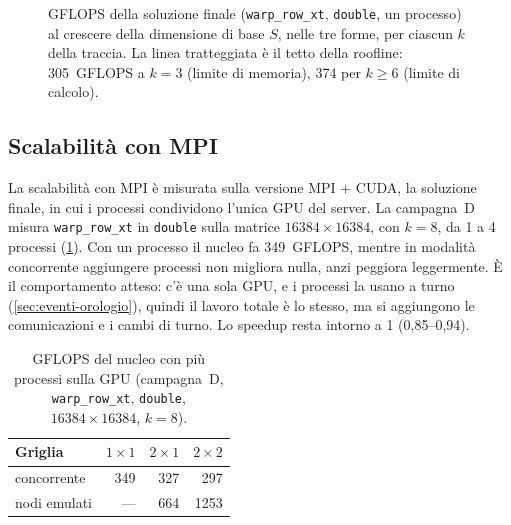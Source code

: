\documentclass[11pt,a4paper]{article}
\begin{document}
\begin{figure}[H]
  \caption{GFLOPS della soluzione finale (\texttt{warp\_row\_xt},
    \texttt{double}, un processo) al crescere della dimensione di base $S$,
    nelle tre forme, per ciascun $k$ della traccia. La linea tratteggiata è il
    tetto della roofline: 305~GFLOPS a $k = 3$ (limite di memoria), 374 per
    $k \ge 6$ (limite di calcolo).}\label{fig:ris-finale}
\end{figure}

\subsection{Scalabilità con MPI}\label{sec:ris-mpi}

La scalabilità con MPI è misurata sulla versione MPI + CUDA, la soluzione
finale, in cui i processi condividono l'unica GPU del server. La campagna~D misura \texttt{warp\_row\_xt} in \texttt{double} sulla matrice
$16384 \times 16384$, con $k = 8$, da 1 a 4 processi
(\cref{tab:ris-mpi-gpu}). Con un processo il nucleo fa 349~GFLOPS, mentre in modalità
concorrente aggiungere processi non migliora nulla, anzi peggiora
leggermente. È il comportamento atteso: c'è una sola GPU, e i processi la usano
a turno (\cref{sec:eventi-orologio}), quindi il lavoro totale è lo stesso, ma si
aggiungono le comunicazioni e i cambi di turno. Lo speedup resta intorno a 1 (0,85--0,94).

\begin{table}[H]
  \centering
  \caption{GFLOPS del nucleo con più processi sulla GPU (campagna~D,
    \texttt{warp\_row\_xt}, \texttt{double}, $16384 \times 16384$, $k = 8$).}\label{tab:ris-mpi-gpu}
  \begin{tabular}{lrrr}
    \toprule
    Griglia & $1 \times 1$ & $2 \times 1$ & $2 \times 2$ \\
    \midrule
    concorrente  & 349 & 327 & 297  \\
    nodi emulati & --- & 664 & 1253 \\
    \bottomrule
  \end{tabular}
\end{table}
\end{document}
